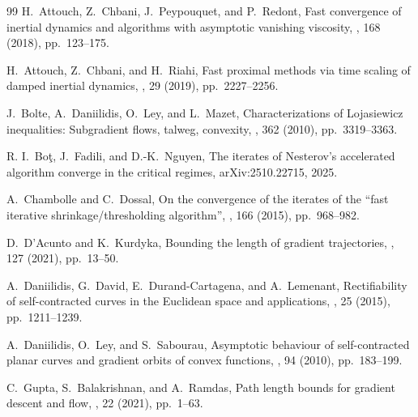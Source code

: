 \documentclass{article}
\theoremstyle{remark}
\begin{document}
\begin{thebibliography}{99}
{\sc H.~Attouch, Z.~Chbani, J.~Peypouquet, and P.~Redont},
\newblock Fast convergence of inertial dynamics and algorithms with asymptotic vanishing viscosity,
, 168 (2018), pp.~123--175.

{\sc H.~Attouch, Z.~Chbani, and H.~Riahi},
\newblock Fast proximal methods via time scaling of damped inertial dynamics,
, 29 (2019), pp.~2227--2256.

{\sc J.~Bolte, A.~Daniilidis, O.~Ley, and L.~Mazet},
\newblock Characterizations of {L}ojasiewicz inequalities: Subgradient flows, talweg, convexity,
, 362 (2010), pp.~3319--3363.

{\sc R. I.~Bo{\c t}, J.~Fadili, and D.-K.~Nguyen},
\newblock The iterates of {N}esterov's accelerated algorithm converge in the critical regimes,
 arXiv:2510.22715, 2025.

{\sc A.~Chambolle and C.~Dossal},
\newblock On the convergence of the iterates of the ``fast iterative shrinkage/thresholding algorithm'',
, 166 (2015), pp.~968--982.

{\sc D.~D'Acunto and K.~Kurdyka},
\newblock Bounding the length of gradient trajectories,
, 127 (2021), pp.~13--50.

{\sc A.~Daniilidis, G.~David, E.~Durand-Cartagena, and A.~Lemenant},
\newblock Rectifiability of self-contracted curves in the {E}uclidean space and applications,
, 25 (2015), pp.~1211--1239.

{\sc A.~Daniilidis, O.~Ley, and S.~Sabourau},
\newblock Asymptotic behaviour of self-contracted planar curves and gradient orbits of convex functions,
, 94 (2010), pp.~183--199.

{\sc C.~Gupta, S.~Balakrishnan, and A.~Ramdas},
\newblock Path length bounds for gradient descent and flow,
, 22 (2021), pp.~1--63.


\end{thebibliography}
\end{document}
